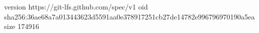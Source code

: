 version https://git-lfs.github.com/spec/v1
oid sha256:36ae68a7a013443623d5591aa0e378917251cb27de14782e996796970190a5ea
size 174916
